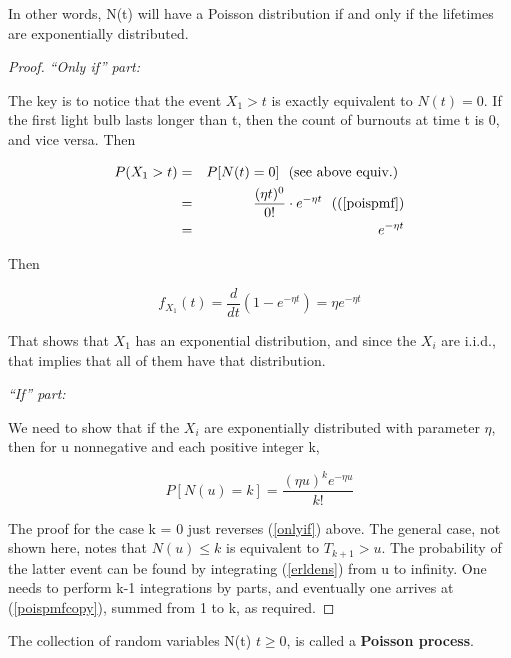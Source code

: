 In other words, N(t) will have a Poisson distribution if and only if the
lifetimes are exponentially distributed.  

\begin{proof}

{\it ``Only if'' part:}

The key is to notice that the event $X_1 > t$ is exactly equivalent to
$N(t) = 0$.  If the first light bulb lasts longer than t, then the
count of burnouts at time t is 0, and vice versa.  Then

\begin{eqnarray}
\label{onlyif}
P(X_1 > t) &=& P[N(t) = 0] ~~ \textrm{(see above equiv.) } \\
&=& \frac{(\eta t)^0}{0!} \cdot e^{-\eta t} ~~ ((\ref{poispmf})\\
&=& e^{-\eta t} 
\end{eqnarray}

Then

\begin{equation} 
f_{X_1}(t) = \frac{d}{dt} (1 - e^{-\eta t}) =
\eta e^{-\eta t} 
\end{equation}

That shows that $X_1$ has an exponential distribution, and since the
$X_i$ are i.i.d., that implies that all of them have that distribution.

{\it ``If'' part:}

We need to show that if the $X_i$ are exponentially distributed with
parameter $\eta$, then for u nonnegative and each positive integer k,

\begin{equation}
\label{poispmfcopy}
P[N(u) = k] = \frac{(\eta u)^k e^{-\eta u}}{k!}
\end{equation}

The proof for the case k = 0 just reverses (\ref{onlyif}) above.  The
general case, not shown here, notes that $N(u) \leq k$ is equivalent to
$T_{k+1} > u$.  The probability of the latter event can be found by
integrating (\ref{erldens}) from u to infinity.  One needs to perform
k-1 integrations by parts, and eventually one arrives at
(\ref{poispmfcopy}), summed from 1 to k, as required.

\end{proof}
  
The collection of random variables N(t) $t \geq 0$, is called a {\bf
Poisson process}.


